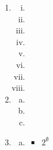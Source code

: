 \documentclass{article}
\begin{document}
\begin{enumerate}
\begin{enumerate}[(a)]
\begin{enumerate}[(i)]
      \item %

    \end{enumerate}

    \item %
    \begin{enumerate}[(i)]
      \item %

      \item %

      \item %

    \end{enumerate}
  \end{enumerate}

  \item
  \begin{enumerate}[(i)]
    \item %

    \item %

    \item %

    \item %

    \item %

    \item %

    \item %

    \item %

  \end{enumerate}

  \item
  \begin{enumerate}[(a)]
    \item %

    \item %

    \item %

  \end{enumerate}

  \item
  \begin{enumerate}[(a)]
    \item %
    \begin{itemize}
      \item $2^{\emptyset}$


\end{itemize}
\end{enumerate}
\end{enumerate}
\end{document}
